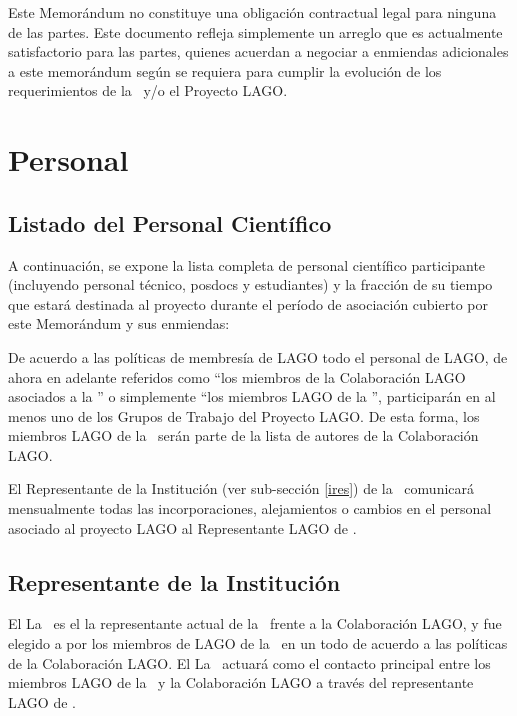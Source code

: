 Este Memorándum no constituye una obligación contractual legal para ninguna de
las partes. Este documento refleja simplemente un arreglo que es actualmente
satisfactorio para las partes, quienes acuerdan a negociar a enmiendas
adicionales a este memorándum según se requiera para cumplir la evolución de
los requerimientos de la \institution~y/o el Proyecto LAGO.

\section{Personal}

\subsection{Listado del Personal Científico}

A continuación, se expone la lista completa de personal científico participante
(incluyendo personal técnico, posdocs y estudiantes) y la fracción de su tiempo
que estará destinada al proyecto durante el período de asociación cubierto por
este Memorándum y sus enmiendas:



De acuerdo a las políticas de membresía de LAGO todo el personal de LAGO, de
ahora en adelante referidos como ``los miembros de la Colaboración LAGO
asociados a la \institution'' o simplemente ``los miembros LAGO de la
\institution'', participarán en al menos uno de los Grupos de Trabajo del
Proyecto LAGO. De esta forma, los miembros LAGO de la \institution~serán parte
de la lista de autores de la Colaboración LAGO.

El Representante de la Institución (ver sub-sección \ref{ires}) de la
\institution~comunicará mensualmente todas las incorporaciones, alejamientos o
cambios en el personal asociado al proyecto LAGO al Representante LAGO de
\country.

\subsection{Representante de la Institución\label{ires}}

\ifirg El \else La \fi \instrep~es
\ifirg el \else la \fi representante actual de la
\institution~frente a la Colaboración LAGO, y fue elegid\ifirg o \else a \fi por los miembros de
LAGO de la \institution~en un todo de acuerdo a las políticas de la
Colaboración LAGO. \ifirg El \else La \fi \instrep~actuará como el
contacto principal entre los miembros LAGO de la \institution~y la Colaboración
LAGO a través del representante LAGO de \country.

